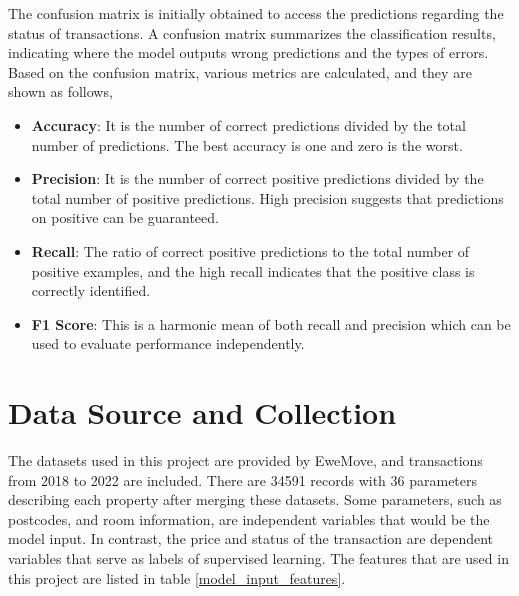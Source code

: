 \documentclass[12pt,twoside]{report}
\begin{document}
The confusion matrix is initially obtained to access the predictions regarding the status of transactions. A confusion matrix summarizes the classification results, indicating where the model outputs wrong predictions and the types of errors. Based on the confusion matrix, various metrics are calculated, and they are shown as follows, 
\begin{itemize}
	\item \textbf{Accuracy}: It is the number of correct predictions divided by the total number of predictions. The best accuracy is one and zero is the worst. 
	\item \textbf{Precision}: It is the number of correct positive predictions divided by the total number of positive predictions. High precision suggests that predictions on positive can be guaranteed.
	\item \textbf{Recall}: The ratio of correct positive predictions to the total number of positive examples, and the high recall indicates that the positive class is correctly identified. 
	\item \textbf{F1 Score}: This is a harmonic mean of both recall and precision which can be used to evaluate performance independently. 
\end{itemize}

\section{Data Source and Collection}
The datasets used in this project are provided by EweMove, and transactions from 2018 to 2022 are included. There are 34591 records with 36 parameters describing each property after merging these datasets. Some parameters, such as postcodes, and room information, are independent variables that would be the model input. In contrast, the price and status of the transaction are dependent variables that serve as labels of supervised learning. The features that are used in this project are listed in table \ref{model_input_features}. 
\end{document}
